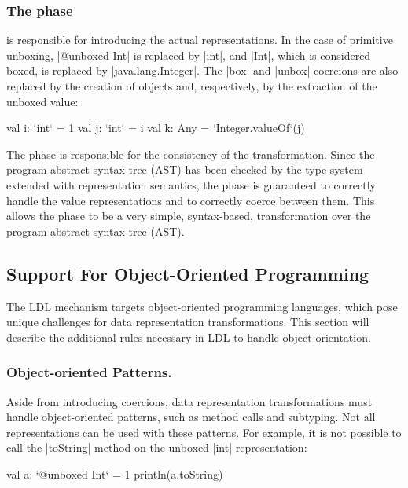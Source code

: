 \subsubsection{The \commit{} phase} is responsible for introducing the actual
representations. In the case of primitive unboxing, |@unboxed Int| is
replaced by |int|, and |Int|, which is considered boxed, is replaced
by |java.lang.Integer|. The |box| and |unbox| coercions are also
replaced by the creation of objects and, respectively, by the
extraction of the unboxed value:

\begin{lstlisting-nobreak}
val i: `int` = 1
val j: `int` = i
val k: Any = `Integer.valueOf`(j)
\end{lstlisting-nobreak}

The \commit{} phase is responsible for the consistency of the transformation. Since the program abstract syntax tree (AST) has been checked by the type-system extended with representation semantics, the \commit{} phase is guaranteed to correctly handle the value representations and to correctly coerce between them. This allows the \commit{} phase to be a very simple, syntax-based, transformation over the program abstract syntax tree (AST).

\subsection{Support For Object-Oriented Programming}
\label{sec:ldl:oo-patterns}

The LDL mechanism targets object-oriented programming languages, which pose unique challenges for data representation transformations. This section will describe the additional rules necessary in LDL to handle object-orientation.

\subsubsection{Object-oriented Patterns.} Aside from introducing coercions, data representation transformations must handle object-oriented patterns, such as method calls and subtyping. Not all representations can be used with these patterns. For example, it is not possible to call the |toString| method on the unboxed |int| representation:

\begin{lstlisting-nobreak}
val a: `@unboxed Int` = 1
println(a.toString)
\end{lstlisting-nobreak}

